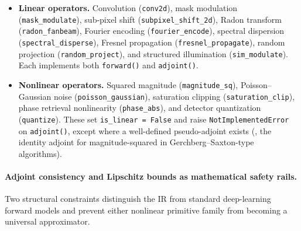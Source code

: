 \begin{itemize}
  \item \textbf{Linear operators.}  Convolution (\texttt{conv2d}), mask
    modulation (\texttt{mask\_modulate}), sub-pixel shift (\texttt{subpixel\_shift\_2d}),
    Radon transform (\texttt{radon\_fanbeam}),
    Fourier encoding (\texttt{fourier\_encode}), spectral dispersion
    (\texttt{spectral\_disperse}), Fresnel propagation
    (\texttt{fresnel\_propagate}), random projection
    (\texttt{random\_project}), and structured illumination
    (\texttt{sim\_modulate}).
    Each implements both \texttt{forward()} and \texttt{adjoint()}.
  \item \textbf{Nonlinear operators.}  Squared magnitude
    (\texttt{magnitude\_sq}), Poisson--Gaussian noise
    (\texttt{poisson\_gaussian}), saturation clipping
    (\texttt{saturation\_clip}), phase retrieval nonlinearity
    (\texttt{phase\_abs}), and detector quantization
    (\texttt{quantize}).
    These set \texttt{is\_linear = False} and raise
    \texttt{NotImplementedError} on \texttt{adjoint()}, except where a
    well-defined pseudo-adjoint exists (\eg{}, the identity adjoint for
    magnitude-squared in Gerchberg--Saxton-type algorithms).
\end{itemize}

\paragraph{Adjoint consistency and Lipschitz bounds as mathematical safety rails.}
Two structural constraints distinguish the \opg{} IR from standard deep-learning
forward models and prevent either nonlinear primitive family from becoming a
universal approximator.

